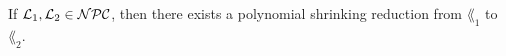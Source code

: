 If $\mathcal{L}_1, \mathcal{L}_2 \in \mathcal{N}\mathcal{P}\mathcal{C}$, then there exists a polynomial shrinking
reduction from $\lang_1$ to $\lang_2$.